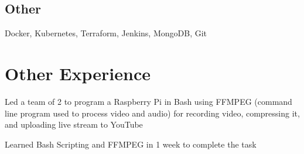 \documentclass[]{deedy-resume-openfont}
\begin{document}
\begin{minipage}[t]{0.33\textwidth}
    \subsection{Other}
    \vspace{\topsep} %
    Docker, Kubernetes, Terraform,
    Jenkins, MongoDB, Git
    
    
    
        
        
        \section {Other Experience}
        \begin{tightemize}
            \item Led a team of 2 to program a Raspberry Pi in Bash using FFMPEG (command line program used to process video and audio) for recording video, compressing it, and uploading live stream to YouTube
            \item Learned Bash Scripting and FFMPEG in 1 week to complete the task
        \end{tightemize}

        
        \vspace{\topsep} %
        

\end{minipage}
\end{document}
